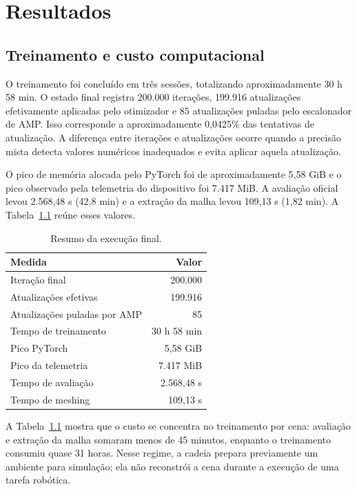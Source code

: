 \chapter{Resultados}\label{cap:resultados}

\section{Treinamento e custo computacional}

O treinamento foi concluído em três sessões, totalizando aproximadamente 30 h 58 min. O estado final registra 200.000 iterações, 199.916 atualizações efetivamente aplicadas pelo otimizador e 85 atualizações puladas pelo escalonador de AMP. Isso corresponde a aproximadamente 0,0425\% das tentativas de atualização. A diferença entre iterações e atualizações ocorre quando a precisão mista detecta valores numéricos inadequados e evita aplicar aquela atualização.

O pico de memória alocada pelo PyTorch foi de aproximadamente 5,58 GiB e o pico observado pela telemetria do dispositivo foi 7.417 MiB. A avaliação oficial levou 2.568,48 s (42,8 min) e a extração da malha levou 109,13 s (1,82 min). A Tabela~\ref{tab:custo} reúne esses valores.

\begin{table}[H]
\centering
\caption{Resumo da execução final.}
\label{tab:custo}
\begin{tabular}{lr}
\toprule
\textbf{Medida} & \textbf{Valor} \\
\midrule
Iteração final & 200.000 \\
Atualizações efetivas & 199.916 \\
Atualizações puladas por AMP & 85 \\
Tempo de treinamento & 30 h 58 min \\
Pico PyTorch & 5,58 GiB \\
Pico da telemetria & 7.417 MiB \\
Tempo de avaliação & 2.568,48 s \\
Tempo de meshing & 109,13 s \\
\bottomrule
\end{tabular}
\end{table}

A Tabela~\ref{tab:custo} mostra que o custo se concentra no treinamento por cena: avaliação e extração da malha somaram menos de 45 minutos, enquanto o treinamento consumiu quase 31 horas. Nesse regime, a cadeia prepara previamente um ambiente para simulação; ela não reconstrói a cena durante a execução de uma tarefa robótica.

